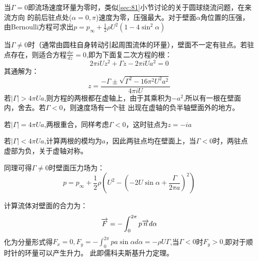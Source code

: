 当$\Gamma=0$即流场速度环量为零时，类似\ref{sec:81}小节讨论的关于圆球绕流问题，在来流方向
的前后驻点处($\alpha=0,\pi$)速度为零，压强最大。对于壁面$\alpha$角位置的压强，由Bernoulli方程可求出$p=p_{\infty}+\frac{1}{2}\rho U^2 (1-4\sin^2\alpha)$

当$\Gamma\neq 0$时（通常由圆柱自身转动引起周围流体的环量），壁面不一定有驻点。若驻点存在，则适合方程$\frac{d w}{d z}=0$,即为下面复二次方程的根：
\begin{equation}
2\pi i U z^2 + \Gamma z - 2\pi i U a^2=0
\end{equation}
其通解为：
\begin{equation}
z=\frac{-\Gamma\pm \sqrt{\Gamma^2-16\pi^2U^2a^2}}{4\pi i U}
\end{equation}
若$|\Gamma|>4\pi Ua$,则方程的两根都在虚轴上，由于其乘积为$-a^2$,所以有一根在壁面内，舍去。若$\Gamma<0$，则速度场有一个驻
出现在虚轴的负半轴壁面外的地方。

若$|\Gamma|=4\pi Ua$,两根重合，同样考虑$\Gamma<0$，这时驻点为$z=-ia$

若$|\Gamma|<4\pi Ua$,计算两根的模均为$a$，因此两驻点均在壁面上，当$\Gamma<0$时，两驻点虚部为负，关于虚轴对称。

同理可得$\Gamma\neq 0$时壁面压力场为：
\begin{equation}
p=p_{\infty}+\frac{1}{2}\rho(U^2-(-2U\sin\alpha+\frac{\Gamma}{2\pi a})^2)
\end{equation}

计算流体对壁面的合力为：
\begin{equation}
\overrightarrow{F}=-\int_{0}^{2\pi} p\overrightarrow{n}d\alpha
\end{equation}
化为分量形式得$F_x=0,F_y=-\int_{0}^{2\pi} pa\sin\alpha d\alpha=-\rho U \Gamma$,当$\Gamma<0$时$F_y>0$,即对于顺时针的环量可以产生升力。
此即儒科夫斯基升力定理。
\begin{equation}
\end{equation}
